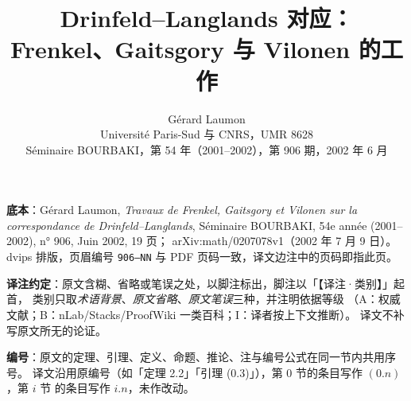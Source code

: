 \documentclass[11pt,a4paper]{article}
\title{Drinfeld--Langlands 对应：\\[0.35em]
Frenkel、Gaitsgory 与 Vilonen 的工作}
\author{Gérard Laumon\\[0.3em]
\small Université Paris-Sud 与 CNRS，UMR 8628\\[0.2em]
\small Séminaire BOURBAKI，第 54 年（2001--2002），第 906 期，2002 年 6 月}
\date{}
\begin{document}
\maketitle

\noindent\small\raggedright
\textbf{底本}：Gérard Laumon, \emph{Travaux de Frenkel, Gaitsgory et Vilonen sur la
correspondance de Drinfeld--Langlands},\allowbreak{} Séminaire BOURBAKI,\allowbreak{}
54e année (2001--2002),\allowbreak{} n° 906,\allowbreak{} Juin 2002,\allowbreak{}
19 页；\allowbreak{} arXiv:math/0207078v1（2002 年 7 月 9 日）。
dvips 排版，页眉编号 \texttt{906--NN} 与 PDF 页码一致，译文边注中的页码即指此页。\par

\medskip
\noindent\small
\textbf{译注约定}：原文含糊、省略或笔误之处，以脚注标出，脚注以「【译注·类别】」起首，
类别只取\emph{术语背景}、\emph{原文省略}、\emph{原文笔误}三种，并注明依据等级
（A：权威文献；B：nLab/Stacks/ProofWiki 一类百科；I：译者按上下文推断）。
译文不补写原文所无的论证。

\medskip
\noindent\small
\textbf{编号}：原文的定理、引理、定义、命题、推论、注与编号公式在同一节内共用序号。
译文沿用原编号（如「定理 2.2」「引理 (0.3)」），第 0 节的条目写作 $(0.n)$，第 $i$ 节
的条目写作 $i.n$，未作改动。

\normalsize
\tableofcontents
\newpage











\end{document}
